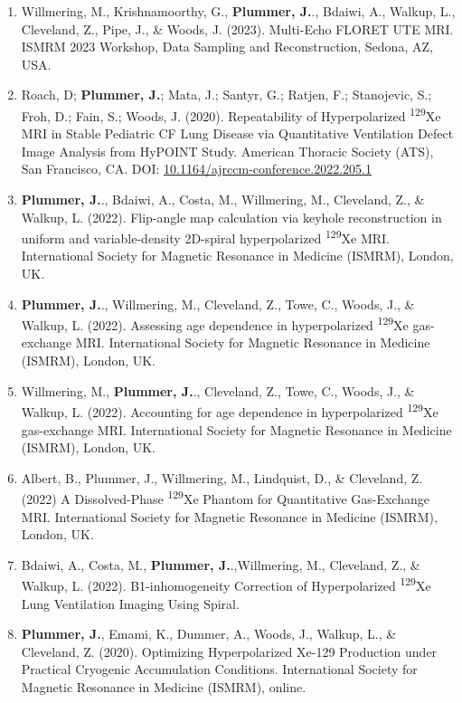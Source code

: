 \documentclass[12pt,]{scrartcl}
\begin{document}
\begin{enumerate}
  \item Willmering, M., Krishnamoorthy, G., \textbf{Plummer, J.}., Bdaiwi, A., Walkup, L., Cleveland, Z., Pipe, J., \& Woods, J. (2023). Multi-Echo FLORET UTE MRI. ISMRM 2023 Workshop, Data Sampling and Reconstruction, Sedona, AZ, USA.  
  
  \item Roach, D; \textbf{ Plummer, J.}; Mata, J.; Santyr, G.; Ratjen, F.; Stanojevic, S.; Froh, D.; Fain, S.; Woods, J. (2020). Repeatability of Hyperpolarized \textsuperscript{129}Xe MRI in Stable Pediatric CF Lung Disease via Quantitative Ventilation Defect Image Analysis from HyPOINT Study. American Thoracic Society (ATS), San Francisco, CA. DOI: \href{https://www.atsjournals.org/doi/abs/10.1164/ajrccm-conference.2022.205.1_MeetingAbstracts.A2555}{10.1164/ajrccm-conference.2022.205.1}
  \item \textbf{Plummer, J.}., Bdaiwi, A., Costa, M., Willmering, M., Cleveland, Z., \& Walkup, L. (2022). Flip-angle map calculation via keyhole reconstruction in uniform and variable-density 2D-spiral hyperpolarized \textsuperscript{129}Xe MRI. International Society for Magnetic Resonance in Medicine (ISMRM), London, UK.
  \item \textbf{Plummer, J.}., Willmering, M., Cleveland, Z., Towe, C., Woods, J., \& Walkup, L. (2022). Assessing age dependence in hyperpolarized \textsuperscript{129}Xe gas-exchange MRI. International Society for Magnetic Resonance in Medicine (ISMRM), London, UK.
  \item  Willmering, M., \textbf{Plummer, J.}., Cleveland, Z., Towe, C., Woods, J., \& Walkup, L. (2022). Accounting for age dependence in hyperpolarized \textsuperscript{129}Xe gas-exchange MRI. International Society for Magnetic Resonance in Medicine (ISMRM), London, UK.
  \item Albert, B., Plummer, J., Willmering, M., Lindquist, D., \& Cleveland, Z. (2022) A Dissolved-Phase \textsuperscript{129}Xe Phantom for Quantitative Gas-Exchange MRI. International Society for Magnetic Resonance in Medicine (ISMRM), London, UK.
  \item  Bdaiwi, A., Costa, M., \textbf{Plummer, J.}.,Willmering, M., Cleveland, Z., \& Walkup, L. (2022). B1-inhomogeneity Correction of Hyperpolarized \textsuperscript{129}Xe Lung Ventilation Imaging Using Spiral.
  \item \textbf{Plummer, J.}, Emami, K., Dummer, A., Woods, J., Walkup, L., \& Cleveland, Z. (2020). Optimizing Hyperpolarized Xe-129 Production under Practical Cryogenic Accumulation Conditions. International Society for Magnetic Resonance in Medicine (ISMRM), online.   

\end{enumerate}
\end{document}
